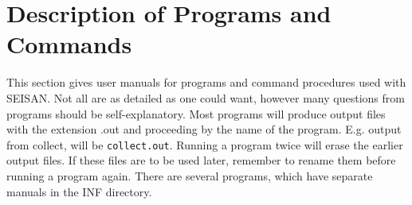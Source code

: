 
%
\chapter{Description of Programs and Commands}
\label{chap:prog-commands}

This section gives user manuals for programs and command procedures used with SEISAN. Not all are as detailed as one could want, however many questions from programs should be self-explanatory. Most programs will produce output files with the extension .out and proceeding by the name of the program. 
E.g. output from collect, will be \texttt{collect.out}. Running a 
program twice will erase the earlier output files. If these files are to be used later, remember to rename them before running a program again. There are several programs, which have separate manuals in the INF directory.  

